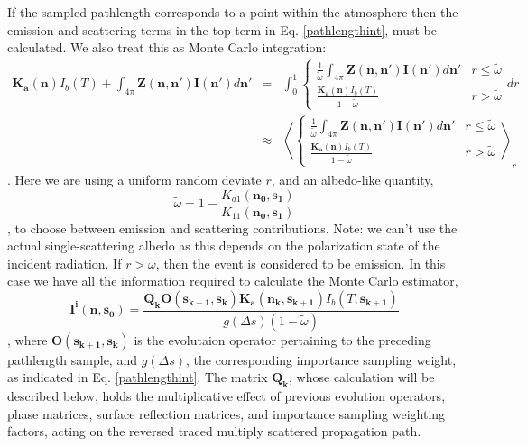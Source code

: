 If the sampled pathlength corresponds to a point within the
atmosphere then the emission and scattering terms in the top term in
Eq. \ref{pathlengthint}, must be calculated.  We also treat this as
Monte Carlo integration:
\begin{eqnarray}
\mathbf{K_a(n)}I_b(T)
+\int_{4\pi}\mathbf{Z(n,n')}\mathbf{I(n')}d\mathbf{n'}&=&\int_0^1\left\{\begin{array}{rl}\frac{1}{\tilde{\omega}}\int_{4\pi}\mathbf{Z(n,n')}\mathbf{I(n')}d\mathbf{n'}
& r \le \tilde{\omega}\\
\frac{\mathbf{K_a(n)}I_b(T)}{1-\tilde{\omega}}& r >
\tilde{\omega}\end{array}dr\right.\nonumber\\
&\approx&\left\langle\left\{\begin{array}{rl}\frac{1}{\tilde{\omega}}\int_{4\pi}\mathbf{Z(n,n')}\mathbf{I(n')}d\mathbf{n'}
& r \le \tilde{\omega}\\
\frac{\mathbf{K_a(n)}I_b(T)}{1-\tilde{\omega}}& r >
\tilde{\omega}\end{array}\right.\right\rangle_r
\label{emiss-or-scatter}
\end{eqnarray}.
Here we are using a uniform random deviate $r$, and an
albedo-like quantity,
\begin{equation}
\tilde{\omega}=1-\frac{K_{a1}(\mathbf{n_{0},s_{1}})}{K_{11}(\mathbf{n_{0},s_{1}})}
\end{equation}
, to choose between emission and scattering contributions.
Note: we can't use the actual single-scattering albedo as this depends
on the polarization state of the incident radiation.  If
$r>\tilde{\omega}$, then the event is considered to be emission.  In
this case we have all the information required to calculate the Monte
Carlo estimator,
\begin{equation}
\mathbf{I^i(n,s_0)}=\frac{\mathbf{Q_k O(s_{k+1},s_k)}
  \mathbf{K_a(n_k,s_{k+1})} I_b(T,\mathbf{s_{k+1}})}
  {g\left(\Delta s\right)\left(1-\tilde{\omega}\right)}
\label{Iemission}
\end{equation}
, where $\mathbf{O(s_{k+1},s_k)}$ is the evolutaion operator
pertaining to the preceding pathlength sample, and $g\left(\Delta
s\right)$, the corresponding importance sampling weight, as indicated
in Eq. \ref{pathlengthint}.  The matrix $\mathbf{Q_k}$, whose
calculation will be described below, holds the
multiplicative effect of previous evolution operators, phase matrices,
surface reflection matrices, and importance sampling weighting
factors, acting on the reversed traced multiply scattered propagation
path. 

